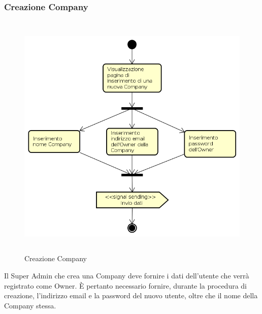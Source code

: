 \subsubsection{Creazione Company}
\begin{figure}[H]
\begin{center}
\includegraphics[height=12cm]{res/sections/backend/activities/creazioneCompanySA.png}
\caption{Creazione Company}
\end{center}
\end{figure}
Il Super Admin che crea una Company deve fornire i dati dell'utente che verrà registrato come Owner. È pertanto necessario fornire, durante la procedura di creazione, l'indirizzo email e la password del nuovo utente, oltre che il nome della Company stessa.
